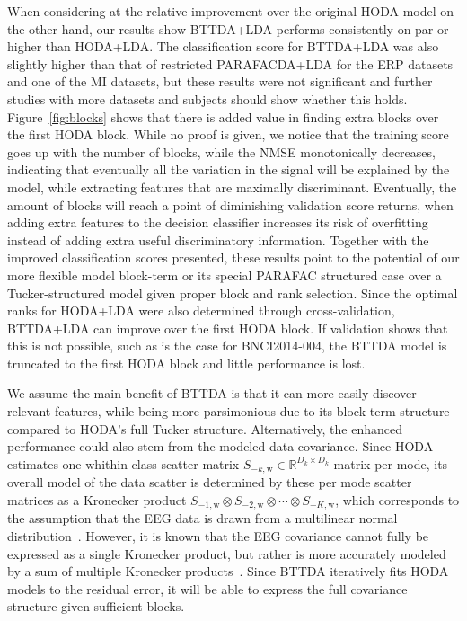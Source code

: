 \documentclass[twocolumn]{article}
\begin{document}
When considering at the relative improvement over the original HODA model on the
other hand, our results show BTTDA+LDA performs consistently on par or higher than HODA+LDA.
The classification score for BTTDA+LDA was also slightly higher than that of
restricted PARAFACDA+LDA for the ERP datasets and one of the MI datasets, but these
results were not significant and further studies with more datasets and
subjects should show whether this holds.
Figure~\ref{fig:blocks} shows that there is added value in finding extra blocks
over the first \textsc{HODA} block.
While no proof is given, we notice that the training score goes up with the
number of blocks, while the NMSE monotonically decreases, indicating that
eventually all the variation in the signal will be explained by the model, while
extracting features that are maximally discriminant.
Eventually, the amount of blocks will reach a point of diminishing validation
score returns, when adding extra features to the decision classifier increases
its risk of overfitting instead of adding extra useful discriminatory
information.
Together with the improved classification scores presented, these results
point to the potential of our more flexible model block-term or
its special PARAFAC structured case over a Tucker-structured model given proper block and
rank selection.
Since the optimal ranks for HODA+LDA were also determined through
cross-validation, BTTDA+LDA can improve over the first \textsc{HODA} block.
If validation shows that this is not possible, such as is the case for
BNCI2014-004, the BTTDA model is truncated to the first HODA block and little
performance is lost.

We assume the main benefit of BTTDA is that it can more easily discover relevant
features, while
being more parsimonious due to its block-term structure compared to HODA's full
Tucker structure.
Alternatively, the enhanced performance could also stem from the modeled data
covariance.
Since HODA estimates one whithin-class scatter matrix
$S_{-k,\text{w}}\in\mathbb{R}^{D_k\times D_k}$ matrix per mode, its overall
model of the data scatter is determined by these per mode scatter matrices as a
Kronecker product $S_{-1,\text{w}}\otimes S_{-2,\text{w}}\otimes\cdots\otimes S_{-K,\text{w}}$, which corresponds to the assumption that the EEG data is
drawn from a multilinear normal distribution~\cite{Ohlson2013}.
However, it is known that the EEG covariance cannot fully be expressed as a
single Kronecker product, but rather is more accurately modeled by a sum of
multiple Kronecker products~\cite{Bijma2005, Sosulski2022}.
Since BTTDA iteratively fits HODA models to the residual error, it will be able
to express the full covariance structure given sufficient blocks.
\end{document}
